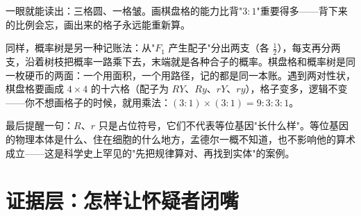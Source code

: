 一眼就能读出：三格圆、一格皱。画棋盘格的能力比背"$3:1$"重要得多——背下来的比例会忘，画出来的格子永远能重新算。

同样，概率树是另一种记账法：从"$F_1$ 产生配子"分出两支（各 $\frac{1}{2}$），每支再分两支，沿着树枝把概率一路乘下去，末端就是各种合子的概率。棋盘格和概率树是同一枚硬币的两面：一个用面积，一个用路径，记的都是同一本账。遇到两对性状，棋盘格要画成 $4\times4$ 的十六格（配子为 $RY$、$Ry$、$rY$、$ry$），格子变多，逻辑不变——你不想画格子的时候，就用乘法：$(3:1)\times(3:1)=9:3:3:1$。

最后提醒一句：$R$、$r$ 只是占位符号，它们不代表等位基因"长什么样"。等位基因的物理本体是什么、住在细胞的什么地方，孟德尔一概不知道，也不影响他的算术成立——这是科学史上罕见的"先把规律算对、再找到实体"的案例。

\section{证据层：怎样让怀疑者闭嘴}

